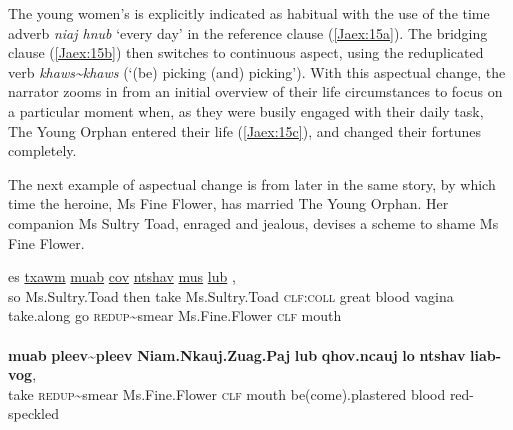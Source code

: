 \documentclass[output=paper]{LSP/langsci}
\begin{document}
\noindent
The young women’s  is explicitly indicated as habitual with the use of the time adverb \textit{niaj hnub} `every day' in the reference clause (\ref{Jaex:15a}). The bridging clause (\ref{Jaex:15b}) then switches to continuous aspect, using the reduplicated verb \textit{khaws\~{}khaws} (`(be) picking (and) picking'). With this aspectual change, the narrator zooms in from an initial overview of their life circumstances to focus on a particular moment when, as they were busily engaged with their daily task, The Young Orphan entered their life (\ref{Jaex:15c}), and changed their fortunes completely.
 
The next example of aspectual change is from later in the same story, by which time the heroine, Ms Fine Flower, has married The Young Orphan. Her companion Ms Sultry Toad, enraged and jealous, devises a scheme to shame Ms Fine Flower.
 
\begin{exe}
\ex \label{Jaex:16ab}
\begin{xlist}
\ex \label{Jaex:16a}
\gll es \underline{} \underline{txawm} \underline{muab} \underline{} \underline{cov} \underline{}     \underline{ntshav} \underline{} \underline{} \underline{mus}     \underline{} \underline{} \underline{lub} \underline{},\\
 so Ms.Sultry.Toad    then  take  Ms.Sultry.Toad \textsc{clf:coll} great blood vagina take.along go  \textsc{redup}{\textasciitilde}smear Ms.Fine.Flower \textsc{clf} mouth\\
\glt {}\\
\ex \label{Jaex:16b}
\gll \textbf{muab} \textbf{pleev{\textasciitilde}pleev}  \textbf{Niam.Nkauj.Zuag.Paj} \textbf{lub} \textbf{qhov.ncauj} \textbf{lo} \textbf{ntshav} \textbf{liab-vog}, \\     	      
     take \textsc{redup}{\textasciitilde}smear Ms.Fine.Flower \textsc{clf} mouth be(come).plastered blood  red-speckled\\
\glt {} \citep[][162]{johnson92}
\end{xlist}
\end{exe}
\end{document}
